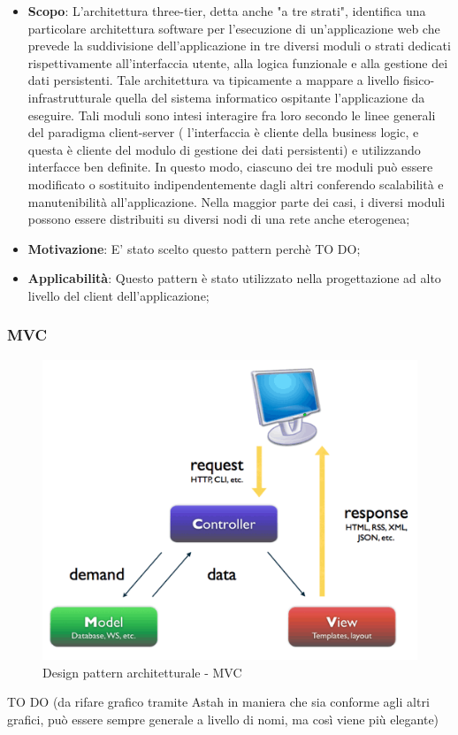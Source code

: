 		
		\begin{itemize}
			\item \textbf{Scopo}: L'architettura three-tier, detta anche "a tre strati", identifica una particolare architettura software per l'esecuzione di un'applicazione web che prevede la suddivisione dell'applicazione in tre diversi moduli o strati dedicati rispettivamente all'interfaccia utente, alla logica funzionale e alla gestione dei dati persistenti. Tale architettura va tipicamente a mappare a livello fisico-infrastrutturale quella del sistema informatico ospitante l'applicazione da eseguire.
Tali moduli sono intesi interagire fra loro secondo le linee generali del paradigma client-server ( l'interfaccia è cliente della business logic, e questa è cliente del modulo di gestione dei dati persistenti) e utilizzando interfacce ben definite. In questo modo, ciascuno dei tre moduli può essere modificato o sostituito indipendentemente dagli altri conferendo scalabilità e manutenibilità all'applicazione. Nella maggior parte dei casi, i diversi moduli possono essere distribuiti su diversi nodi di una rete anche eterogenea;
			
			\item \textbf{Motivazione}: E' stato scelto questo pattern perchè TO DO;
			
			\item \textbf{Applicabilità}: Questo pattern è stato utilizzato nella progettazione ad alto livello del client dell'applicazione;
			
		\end{itemize}


		\newpage
		\subsubsection{MVC} %
		
		\begin{figure}[htbp]
			\centering
			\centerline{\includegraphics[scale=0.6]{./images/mvc.png}}
			\caption{Design pattern architetturale - MVC}
		\end{figure}
		TO DO (da rifare grafico tramite Astah in maniera che sia conforme agli altri grafici, può essere sempre generale a livello di nomi, ma così viene più elegante)

